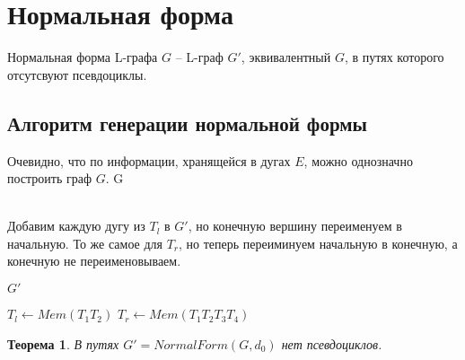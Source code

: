 \documentclass{article}
\newtheorem{theorem}{Теорема}[section]
\newenvironment{definition}[1][Определение]{\begin{trivlist}
\item[\hskip \labelsep {\bfseries #1}]}{\end{trivlist}}
\begin{document}
\section{Нормальная форма}

\begin{definition}
    Нормальная форма L-графа $G$ -- L-граф $G'$, эквивалентный $G$, в путях которого отсутсвуют псевдоциклы.
\end{definition}

\subsection*{Алгоритм генерации нормальной формы}
\begin{algorithmic}
        \State Очевидно, что по информации, хранящейся в дугах $E$, можно однозначно построить граф $G$.
        \State \Return G
    \EndFunction
    
    \\
        \State Добавим каждую дугу из $T_l$ в $G'$, но конечную вершину переименуем в начальную.
        \State То же самое для $T_r$, но теперь переиминуем начальную в конечную, а конечную не переименовываем.

        \State \Return $G'$
    \EndFunction
    \\

                \State $T_l \gets Mem(T_1 T_2)$
                \State $T_r \gets Mem(T_1 T_2 T_3 T_4)$
                \EndIf
            \EndFor
        \EndFor

        \State {}
    \EndFunction
\end{algorithmic}

\begin{theorem}
    В путях $G' = NormalForm(G, d_0)$ нет псевдоциклов.
\end{theorem}
\end{document}
